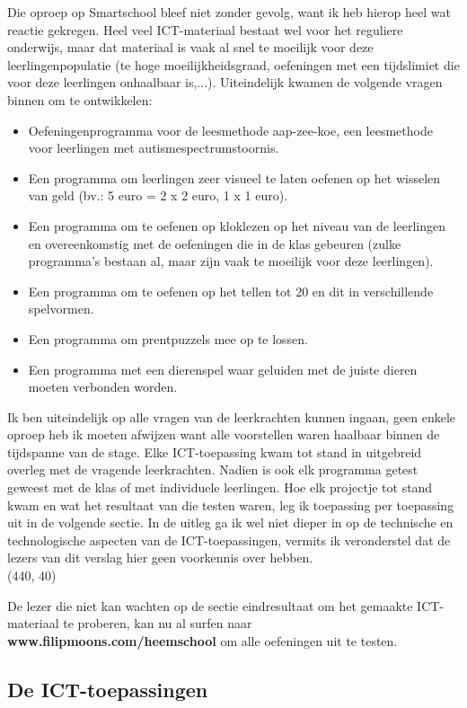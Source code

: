 \documentclass[a4paper,11pt]{article}
\theoremstyle{definition}
\begin{document}
\begin{itemize}
\begin{itemize}
Die oproep op Smartschool bleef niet zonder gevolg, want ik heb hierop heel wat reactie gekregen. Heel veel ICT-materiaal bestaat wel voor het reguliere onderwijs, maar dat materiaal is 
vaak al snel te moeilijk voor deze leerlingenpopulatie (te hoge moeilijkheidsgraad, oefeningen met een tijdslimiet die voor deze leerlingen onhaalbaar is,...). Uiteindelijk kwamen de volgende vragen binnen om te ontwikkelen:
\begin{itemize}
\item Oefeningenprogramma voor de leesmethode aap-zee-koe, een leesmethode voor leerlingen met 
autismespectrumstoornis.
\item Een programma om leerlingen zeer visueel te laten oefenen op het wisselen van geld (bv.: 5 euro = 2 x 2 euro, 1 x 1 euro).
\item Een programma om te oefenen op kloklezen op het niveau van de leerlingen en overeenkomstig met de oefeningen die in de klas gebeuren (zulke programma's bestaan al, maar zijn vaak te moeilijk voor deze leerlingen).
\item Een programma om te oefenen op het tellen tot 20 en dit in verschillende spelvormen.
\item Een programma om prentpuzzels mee op te lossen.
\item Een programma met een dierenspel waar geluiden met de juiste dieren moeten 
verbonden worden.
\end{itemize}
Ik ben uiteindelijk op alle vragen van de leerkrachten kunnen ingaan, geen enkele oproep heb ik moeten afwijzen want alle voorstellen waren haalbaar binnen de tijdspanne van de stage. 
Elke ICT-toepassing kwam tot stand in uitgebreid overleg met de vragende 
leerkrachten. Nadien is ook elk programma getest geweest met de klas of met 
individuele leerlingen. Hoe elk projectje tot stand kwam en wat het resultaat 
van die testen waren, leg ik toepassing per toepassing uit in de volgende sectie. In 
de uitleg ga ik wel niet dieper in op de technische en technologische aspecten van de ICT-toepassingen, 
vermits ik veronderstel dat de lezers van dit verslag hier geen voorkennis over 
hebben.\\

\noindent\framebox(440, 40){ 
\parbox{430\unitlength}{De lezer die niet kan wachten op de sectie eindresultaat om het gemaakte ICT-materiaal te proberen, kan nu al surfen
naar \textbf{www.filipmoons.com/heemschool} om alle oefeningen uit te testen.}
}
\subsection{De ICT-toepassingen}

\end{itemize}
\end{itemize}
\end{document}
